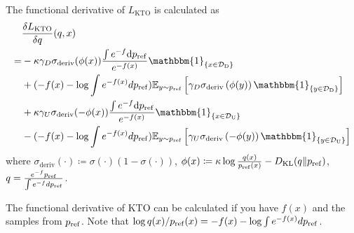 \begin{prop}
    The functional derivative of $L_\mathrm{KTO}$ is calculated as
    \begin{align}
        &\frac{\delta L_\mathrm{KTO}}{\delta q}(q,x)\\
        =& 
        - \kappa \gamma_D \sigma_\mathrm{deriv}(\phi(x))\frac{\int e^{-f}\mathrm{d}\pref}{e^{-f(x)}}\mathbbm{1}_{\lbrace x \in \mathcal{D}_\mathrm{D}\rbrace}\\
        &+ (-f(x) - \log \int e^{-f(x)}d\pref)
        \E_{y\sim \pref}
        \left[ 
        \gamma_D \sigma_{\mathrm{deriv}}\left(\phi(y)\right)\mathbbm{1}_{\lbrace y \in \mathcal{D}_\mathrm{D}\rbrace}
        \right]\\
        &+ \kappa \gamma_U \sigma_\mathrm{deriv}(-\phi(x))\frac{\int e^{-f}\mathrm{d}\pref}{e^{-f(x)}}\mathbbm{1}_{\lbrace x \in \mathcal{D}_\mathrm{U}\rbrace}\\
        &- (-f(x) - \log \int e^{-f(x)}d\pref)
        \E_{y\sim \pref}
        \left[ 
        \gamma_U \sigma_{\mathrm{deriv}}\left(-\phi(y)\right)\mathbbm{1}_{\lbrace y \in \mathcal{D}_\mathrm{U}\rbrace}
        \right]
    \end{align}
    where $\sigma_\mathrm{deriv}(\cdot) \coloneq \sigma(\cdot) (1- \sigma(\cdot))$, 
    $\phi(x) \coloneq \kappa\log \frac{q(x)}{p_{\rm{ref}}(x)} - D_{\mathrm{KL}}(q\|p_{\rm{ref}})$, $q = \frac{e^{-f}p_{\rm{ref}}}{\int e^{-f}dp_{\rm{ref}}}$. 
\end{prop}
The functional derivative of KTO can be calculated if you have $f(x)$ and the samples from  $p_{\rm{ref}}$. Note that $\log q(x)/p_{\rm{ref}}(x) = -f(x) - \log \int e^{-f(x)}dp_{\rm{ref}}$.

